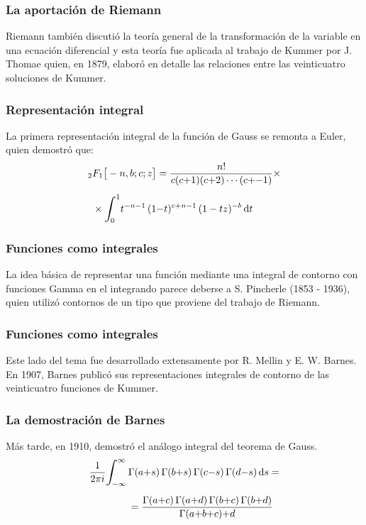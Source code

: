 \documentclass[12pt]{beamer}
\begin{document}
\begin{frame}
\frametitle{La aportación de Riemann}
Riemann también discutió la teoría general de la transformación de la variable en una ecuación diferencial y esta teoría fue aplicada al trabajo de Kummer por J. Thomae quien, en 1879, elaboró en detalle las relaciones entre las veinticuatro soluciones de Kummer.
\end{frame}
\begin{frame}
\frametitle{Representación integral}
La primera representación integral de la función de Gauss se remonta a Euler, quien demostró que:
\pause
\begin{align}
\begin{aligned}[b]
{}_{2} &F_{1} \big[ -n, b; c; z \big] = \dfrac{n!}{c (c {+} 1)(c {+} 2) \cdots (c {+} {-} 1)} \times \\[0.5em]
&\times \scaleint{6ex}_{\bs 0}^{1} t^{-n-1} \, (1 {-} t)^{c+n-1} \, (1 - t z)^{-b} \dd{t}
\end{aligned}
\label{eq:ecuacion_01_01_07}
\end{align}
\end{frame}
\begin{frame}
\frametitle{Funciones como integrales}
La idea básica de representar una función mediante una integral de contorno con funciones Gamma en el integrando parece deberse a S. Pincherle (1853 - 1936), quien utilizó contornos de un tipo que proviene del trabajo de Riemann. 
\end{frame}
\begin{frame}
\frametitle{Funciones como integrales}
Este lado del tema fue desarrollado extensamente por R. Mellin y E. W. Barnes.
\\
\bigskip
\pause
En 1907, Barnes publicó sus representaciones integrales de contorno de las veinticuatro funciones de Kummer.
\end{frame}
\begin{frame}
\frametitle{La demostración de Barnes}
Más tarde, en 1910, demostró el análogo integral del teorema de Gauss.
\begin{align}
\begin{aligned}[b]
\dfrac{1}{2 \pi i} \scaleint{6ex}_{\bs -\infty}^{\infty} \, &\Gamma (a {+} s) \, \Gamma (b {+} s) \, \Gamma(c {-} s) \, \Gamma (d {-} s) \dd{s} = \\[0.5em]
&= \dfrac{\Gamma (a {+} c) \, \Gamma (a {+} d) \, \Gamma(b {+} c) \, \Gamma (b {+} d)}{\Gamma (a {+} b {+} c) {+ d}}
\end{aligned}
\label{eq:ecuacion_01_01_08}
\end{align}
\end{frame}
\end{document}
